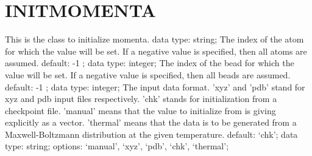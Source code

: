 \section{INITMOMENTA}
\label{INITMOMENTA}
\begin{ipifield}{}%
{This is the class to initialize momenta.}%
{data type: string; }%
{%
{The index of the atom for which the value will be set. If a negative value is specified, then all atoms are assumed.}%
{default:  -1 ; data type: integer; }%
%
{The index of the bead for which the value will be set. If a negative value is specified, then all beads are assumed.}%
{default:  -1 ; data type: integer; }%
%
{The input data format. 'xyz' and 'pdb' stand for xyz and pdb input files respectively. 'chk' stands for initialization from a checkpoint file. 'manual' means that the value to initialize from is giving explicitly as a vector. 'thermal' means that the data is to be generated from a Maxwell-Boltzmann distribution at the given temperature.}%
{default: `chk'; data type: string; options: `manual', `xyz', `pdb', `chk', `thermal'; }%
}
\end{ipifield}

